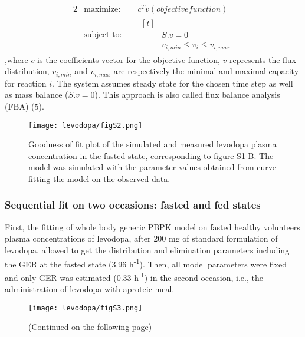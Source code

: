 \begin{alignat*}{2} \tag{1}
  & \text{maximize: } &  & c^{T}v (objective function)\\
  & \text{subject to: } &  &  
                \begin{aligned}[t] \\
                & S.v=0 \\
                & v_{i,min} \leq v_{i}  \leq  v_{i,max}
                \end{aligned}
\end{alignat*}
,where $c$ is the coefficients vector for the objective function, $v$ represents the flux distribution, $v_{i,min}$ and $v_{i,max}$ are respectively the minimal and maximal capacity for reaction $i$. The system assumes steady state for the chosen time step as well as mass balance ($S.v=0$). This approach is also called flux balance analysis (FBA) (5). 
\begin{figure}[!htp]
\centering
	\texttt{[image: levodopa/figS2.png]}%
	\caption[Predicted versus measured levodopa kinetics.]{Goodness of fit plot of the simulated and measured levodopa plasma concentration in the fasted state, corresponding to figure S1-B. The model was simulated with the parameter values obtained from curve fitting the model on the observed data.}
	\label{fig:s2levo}
\end{figure}

\subsubsection{Sequential fit on two occasions: fasted and fed states} \label{levo:sp4}
First, the fitting of whole body generic PBPK model on fasted healthy volunteers plasma concentrations of levodopa, after 200 mg of standard formulation of levodopa, allowed to get the distribution and elimination parameters including the GER at the fasted state (3.96 h\textsuperscript{-1}). Then, all model parameters were fixed and only GER was estimated (0.33 h\textsuperscript{-1}) in the second occasion, i.e., the administration of levodopa with aproteic meal.
\begin{figure}[!htp]
\centering
	\texttt{[image: levodopa/figS3.png]}%
	\caption[Time course of levodopa fluxes.]{(Continued on the following page)}
	\label{fig:s3levo}
\end{figure}
\begin{figure}[t]
\end{figure}
